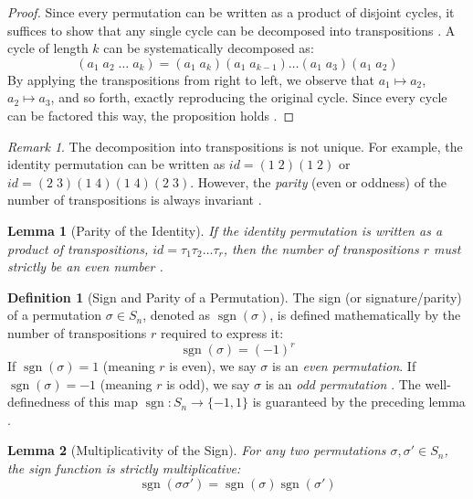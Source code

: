 \documentclass[11pt]{article}
\theoremstyle{definition}
\newtheorem{definition}{Definition}[section]
\theoremstyle{plain}
\newtheorem{lemma}{Lemma}[theorem]
\theoremstyle{remark}
\newtheorem*{remark}{Remark}
\begin{document}
\begin{proof}
Since every permutation can be written as a product of disjoint cycles, it suffices to show that any single cycle can be decomposed into transpositions \cite{dummit}. A cycle of length $k$ can be systematically decomposed as:
\begin{equation} \label{eq:cycle_decomp}
    (a_1 \; a_2 \; \dots \; a_k) = (a_1 \; a_k)(a_1 \; a_{k-1}) \dots (a_1 \; a_3)(a_1 \; a_2)
\end{equation}
By applying the transpositions from right to left, we observe that $a_1 \mapsto a_2$, $a_2 \mapsto a_3$, and so forth, exactly reproducing the original cycle. Since every cycle can be factored this way, the proposition holds \cite{gallian}.
\end{proof}

\begin{remark}
The decomposition into transpositions is not unique. For example, the identity permutation can be written as $id = (1 \; 2)(1 \; 2)$ or $id = (2 \; 3)(1 \; 4)(1 \; 4)(2 \; 3)$. However, the \emph{parity} (even or oddness) of the number of transpositions is always invariant \cite{dummit}.
\end{remark}

\begin{lemma}[Parity of the Identity]
If the identity permutation is written as a product of transpositions, $id = \tau_1 \tau_2 \dots \tau_r$, then the number of transpositions $r$ must strictly be an even number \cite{gallian}.
\end{lemma}

\begin{definition}[Sign and Parity of a Permutation]
The sign (or signature/parity) of a permutation $\sigma \in S_n$, denoted as $\operatorname{sgn}(\sigma)$, is defined mathematically by the number of transpositions $r$ required to express it:
\begin{equation}
    \operatorname{sgn}(\sigma) = (-1)^r
\end{equation}
If $\operatorname{sgn}(\sigma) = 1$ (meaning $r$ is even), we say $\sigma$ is an \emph{even permutation}. If $\operatorname{sgn}(\sigma) = -1$ (meaning $r$ is odd), we say $\sigma$ is an \emph{odd permutation} \cite{fraleigh}. The well-definedness of this map $\operatorname{sgn}: S_n \to \{-1, 1\}$ is guaranteed by the preceding lemma \cite{dummit}.
\end{definition}

\begin{lemma}[Multiplicativity of the Sign]
For any two permutations $\sigma, \sigma' \in S_n$, the sign function is strictly multiplicative:
\begin{equation}
    \operatorname{sgn}(\sigma \sigma') = \operatorname{sgn}(\sigma) \operatorname{sgn}(\sigma')
\end{equation}
\end{lemma}
\end{document}

